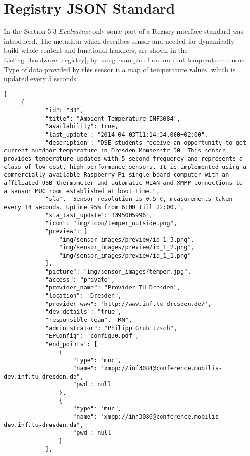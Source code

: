\chapter{Registry JSON Standard}
In the Section 5.3 \emph{Evaluation} only some part of a Regisry interface standard was introduced. The metadata which describes sensor and needed for dynamically build whole content and functional handlers, are shown in the Listing~\ref{hardware_registry}, by using example of an ambient temperature sensor. Type of data provided by this sensor is a map of temperature values, which is updated every 5 seconds.
\begin{lstlisting}[label=hardware_registry,caption=JSON Description Format]
[
     {
            "id": "30",
            "title": "Ambient Temperature INF3084",
            "availability": true,
            "last_update": "2014-04-03T11:14:34.000+02:00",
            "description": "DSE students receive an opportunity to get current outdoor temperature in Dresden Momsenstr.20. This sensor provides temperature updates with 5-second frequency and represents a class of low-cost, high-performance sensors. It is implemented using a commercially available Raspberry Pi single-board computer with an affiliated USB thermometer and automatic WLAN and XMPP connections to a sensor MUC room established at boot time.",
            "sla": "Sensor resolution is 0.5 C, measurements taken every 10 seconds. Uptime 95% from 6:00 till 22:00.",
            "sla_last_update":"1395005996",
            "icon": "img/icon/temper_outside.png",
            "preview": [
                "img/sensor_images/preview/id_1_3.png",
                "img/sensor_images/preview/id_1_2.png",
                "img/sensor_images/preview/id_1_1.png"
            ],
            "picture": "img/sensor_images/temper.jpg",
            "access": "private",
            "provider_name": "Provider TU Dresden",
            "location": "Dresden",
            "provider_www": "http://www.inf.tu-dresden.de/",
            "dev_details": "true",
            "responsible_team": "RN",
            "administrator": "Philipp Grubitzsch",
            "EPConfig": "config30.pdf",
            "end_points": [
                {
                    "type": "muc",
                    "name": "xmpp://inf3084@conference.mobilis-dev.inf.tu-dresden.de",
                    "pwd": null
                },
                {
                    "type": "muc",
                    "name": "xmpp://inf3086@conference.mobilis-dev.inf.tu-dresden.de",
                    "pwd": null
                }
            ],

\end{lstlisting}
